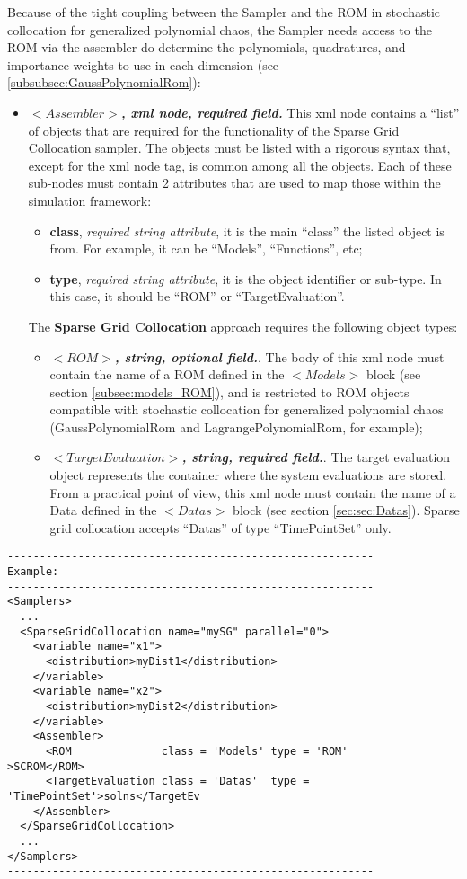 Because of the tight coupling between the Sampler and the ROM in stochastic collocation for generalized polynomial chaos, the Sampler needs access to the ROM via the assembler do determine the polynomials, quadratures, and importance weights to use in each dimension (see \ref{subsubsec:GaussPolynomialRom}):
\begin{itemize}
   \item $<Assembler>$\textbf{\textit{, xml node, required field.}} This xml node contains a ``list'' of objects that are required for the functionality of the Sparse Grid Collocation sampler. The objects must be listed with a rigorous syntax that, except for the xml node tag, is common among all the objects.  
Each of these sub-nodes  must contain 2 attributes that are used to map those within the simulation framework:
   \begin{itemize}
     \item \textbf{class}, \textit{required string attribute}, it is the main ``class'' the listed object is from. For example, it can be ``Models'', ``Functions'', etc;
     \item \textbf{type},  \textit{required string attribute}, it is the object identifier or sub-type. In this case, it should be ``ROM'' or ``TargetEvaluation''. 
    \end{itemize}
The \textbf{Sparse Grid Collocation} approach requires the following object types:
   \begin{itemize}
     \item $<ROM>$\textbf{\textit{, string, optional  field.}}. The body of this xml node must contain the name of a ROM defined in the $<Models>$ block (see section \ref{subsec:models_ROM}), and is restricted to ROM objects compatible with stochastic collocation for generalized polynomial chaos (GaussPolynomialRom and LagrangePolynomialRom, for example);
        \item $<TargetEvaluation>$\textbf{\textit{, string, required field.}}. The target evaluation object represents the container where the system evaluations are stored. From a practical point of view, this xml node must contain the name of a Data defined in the $<Datas>$ block (see section \ref{sec:sec:Datas}). Sparse grid collocation accepts ``Datas'' of type ``TimePointSet'' only.
    \end{itemize}
    
\end{itemize}
\begin{lstlisting}[style=XML]
---------------------------------------------------------
Example:
---------------------------------------------------------
<Samplers>
  ...
  <SparseGridCollocation name="mySG" parallel="0">
    <variable name="x1">
      <distribution>myDist1</distribution>
    </variable>
    <variable name="x2">
      <distribution>myDist2</distribution>
    </variable>
    <Assembler>
      <ROM              class = 'Models' type = 'ROM'         >SCROM</ROM>
      <TargetEvaluation class = 'Datas'  type = 'TimePointSet'>solns</TargetEv
    </Assembler>
  </SparseGridCollocation>
  ...
</Samplers>
---------------------------------------------------------
\end{lstlisting}
 
